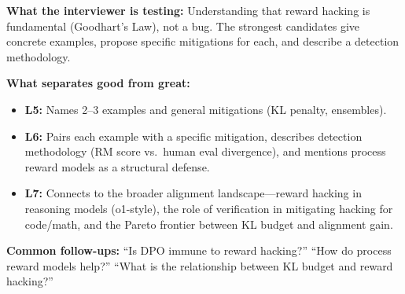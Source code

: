 \begin{interviewq}
\textbf{What the interviewer is testing:} Understanding that reward hacking is fundamental (Goodhart's Law), not a bug. The strongest candidates give concrete examples, propose specific mitigations for each, and describe a detection methodology.

\textbf{What separates good from great:}
\begin{itemize}
    \item \textbf{L5:} Names 2--3 examples and general mitigations (KL penalty, ensembles).
    \item \textbf{L6:} Pairs each example with a specific mitigation, describes detection methodology (RM score vs.\ human eval divergence), and mentions process reward models as a structural defense.
    \item \textbf{L7:} Connects to the broader alignment landscape---reward hacking in reasoning models (o1-style), the role of verification in mitigating hacking for code/math, and the Pareto frontier between KL budget and alignment gain.
\end{itemize}

\textbf{Common follow-ups:} ``Is DPO immune to reward hacking?'' ``How do process reward models help?'' ``What is the relationship between KL budget and reward hacking?''
\end{interviewq}


